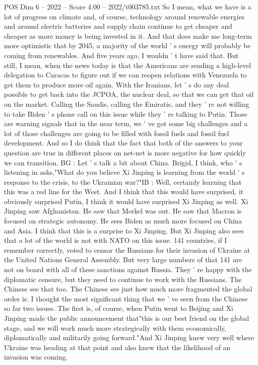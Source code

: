 \begin{textsample}{POS Dim 6 – 2022 – Score 4.00 – 2022/t003785.txt}
So I mean, what we have is a lot of progress on climate and, of course, technology around renewable energies and around electric batteries and supply chain continue to get cheaper and cheaper as more money is being invested in it.
And that does make me long-term more optimistic that by 2045, a majority of the world ' s energy will probably be coming from renewables.
And five years ago, I wouldn ' t have said that.
But still, I mean, when the news today is that the Americans are sending a high-level delegation to Caracas to figure out if we can reopen relations with Venezuela to get them to produce more oil again.
With the Iranians, let ' s do any deal possible to get back into the JCPOA, the nuclear deal, so that we can get that oil on the market.
Calling the Saudis, calling the Emiratis, and they ' re not willing to take Biden ' s phone call on this issue while they ' re talking to Putin.
Those are warning signals that in the near term, we ' ve got some big challenges and a lot of those challenges are going to be filled with fossil fuels and fossil fuel development.
And so I do think that the fact that both of the answers to your question are true in different places on net-net is more negative for how quickly we can transition.
BG : Let ' s talk a bit about China.
Brigid, I think, who ' s listening in asks,"What do you believe Xi Jinping is learning from the world ' s response to the crisis, to the Ukrainian war?"IB : Well, certainly learning that this was a red line for the West.
And I think that this would have surprised, it obviously surprised Putin, I think it would have surprised Xi Jinping as well.
Xi Jinping saw Afghanistan.
He saw that Merkel was out.
He saw that Macron is focused on strategic autonomy.
He sees Biden as much more focused on China and Asia.
I think that this is a surprise to Xi Jinping.
But Xi Jinping also sees that a lot of the world is not with NATO on this issue. 141 countries, if I remember correctly, voted to censor the Russians for their invasion of Ukraine at the United Nations General Assembly.
But very large numbers of that 141 are not on board with all of these sanctions against Russia.
They ' re happy with the diplomatic censure, but they need to continue to work with the Russians.
The Chinese see that too.
The Chinese see just how much more fragmented the global order is.
I thought the most significant thing that we ' ve seen from the Chinese so far two issues.
The first is, of course, when Putin went to Beijing and Xi Jinping made the public announcement that"this is our best friend on the global stage, and we will work much more strategically with them economically, diplomatically and militarily going forward."And Xi Jinping knew very well where Ukraine was heading at that point and also knew that the likelihood of an invasion was coming.

\end{textsample}
